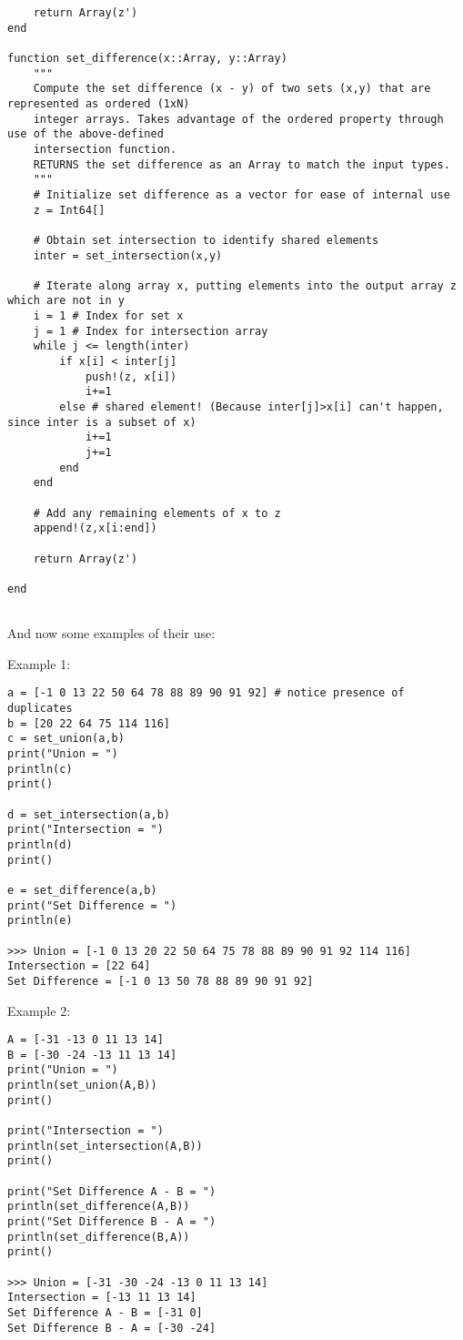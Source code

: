 \documentclass{article}
\begin{document}
\begin{verbatim}
    return Array(z')
end

function set_difference(x::Array, y::Array)
    """
    Compute the set difference (x - y) of two sets (x,y) that are represented as ordered (1xN) 
    integer arrays. Takes advantage of the ordered property through use of the above-defined
    intersection function. 
    RETURNS the set difference as an Array to match the input types.
    """
    # Initialize set difference as a vector for ease of internal use
    z = Int64[]

    # Obtain set intersection to identify shared elements
    inter = set_intersection(x,y)

    # Iterate along array x, putting elements into the output array z which are not in y
    i = 1 # Index for set x
    j = 1 # Index for intersection array
    while j <= length(inter)
        if x[i] < inter[j]
            push!(z, x[i])
            i+=1
        else # shared element! (Because inter[j]>x[i] can't happen, since inter is a subset of x)
            i+=1
            j+=1
        end
    end

    # Add any remaining elements of x to z
    append!(z,x[i:end])

    return Array(z')

end
    
\end{verbatim}

And now some examples of their use:

Example 1:
\begin{verbatim}
a = [-1 0 13 22 50 64 78 88 89 90 91 92] # notice presence of duplicates
b = [20 22 64 75 114 116]
c = set_union(a,b)
print("Union = ")
println(c)
print()

d = set_intersection(a,b)
print("Intersection = ")
println(d)
print()

e = set_difference(a,b)
print("Set Difference = ")
println(e)

>>> Union = [-1 0 13 20 22 50 64 75 78 88 89 90 91 92 114 116]
Intersection = [22 64]
Set Difference = [-1 0 13 50 78 88 89 90 91 92]
\end{verbatim}

Example 2:
\begin{verbatim}
A = [-31 -13 0 11 13 14]
B = [-30 -24 -13 11 13 14]
print("Union = ")
println(set_union(A,B))
print()

print("Intersection = ")
println(set_intersection(A,B))
print()

print("Set Difference A - B = ")
println(set_difference(A,B))
print("Set Difference B - A = ")
println(set_difference(B,A))
print()

>>> Union = [-31 -30 -24 -13 0 11 13 14]
Intersection = [-13 11 13 14]
Set Difference A - B = [-31 0]
Set Difference B - A = [-30 -24]
\end{verbatim}
\end{document}
